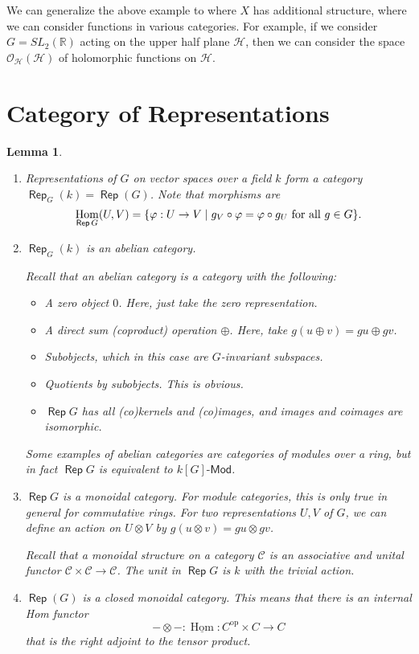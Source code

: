 \documentclass[leqno, openany]{memoir}
\newtheorem{lem}[thm]{Lemma}
\theoremstyle{definition}
\theoremstyle{remark}
\theoremstyle{plain}
\theoremstyle{definition}
\theoremstyle{remark}
\newcommand{\R}{\mathbb{R}}
\newcommand{\mc}[1]{\mathcal{#1}}
\newcommand{\mr}[1]{\mathrm{#1}}
\DeclareMathOperator{\Rep}{\mathsf{Rep}}
\DeclareMathOperator{\Hom}{Hom}
\begin{document}
We can generalize the above example to where $X$ has additional structure,
where we can consider functions in various categories. For example, if we
consider $G = SL_2(\R)$ acting on the upper half plane $\mc{H}$, then we can
consider the space $\mc{O}_{\mc{H}}(\mc{H})$ of holomorphic functions on
$\mc{H}$.

\section{Category of Representations}%

\begin{lem} \begin{enumerate} \item Representations of $G$ on vector spaces
    over a field $k$ form a category $\Rep_G(k) = \Rep(G)$. Note that morphisms
    are \[ \Hom_{\Rep G}(U,V) = \qty{\varphi: U \to V \mid g_V \circ \varphi =
    \varphi \circ g_U \text{ for all } g \in G}. \] \item $\Rep_G(k)$ is an
    abelian category.

            Recall that an abelian category is a category with the following:
            \begin{itemize} \item A zero object $0$. Here, just take the zero
                representation.  \item A direct sum (coproduct) operation
                $\oplus$. Here, take $g(u \oplus v) = gu \oplus gv$.  \item
                Subobjects, which in this case are $G$-invariant subspaces.
            \item Quotients by subobjects. This is obvious.  \item $\Rep G$ has
                all (co)kernels and (co)images, and images and coimages are
                isomorphic.  \end{itemize} Some examples of abelian categories
                are categories of modules over a ring, but in fact $\Rep G$ is
                equivalent to $k[G]\text{-}\mathsf{Mod}$.  \item $\Rep G$ is a
                monoidal category. For module categories, this is only true in
                general for commutative rings. For two representations $U,V$ of
                $G$, we can define an action on $U \otimes V$ by $g(u \otimes
                v) = gu \otimes gv$.

            Recall that a monoidal structure on a category $\mc{C}$ is an
            associative and unital functor $\mc{C} \times \mc{C} \to \mc{C}$.
            The unit in $\Rep G$ is $k$ with the trivial action.  \item
            $\Rep(G)$ is a closed monoidal category. This means that there is
            an internal Hom functor \[ - \otimes -: \underline{\Hom} \colon
        C^{\mr{op}} \times C \to C \] that is the right adjoint to the tensor
product.  \end{enumerate} \end{lem}
\end{document}
